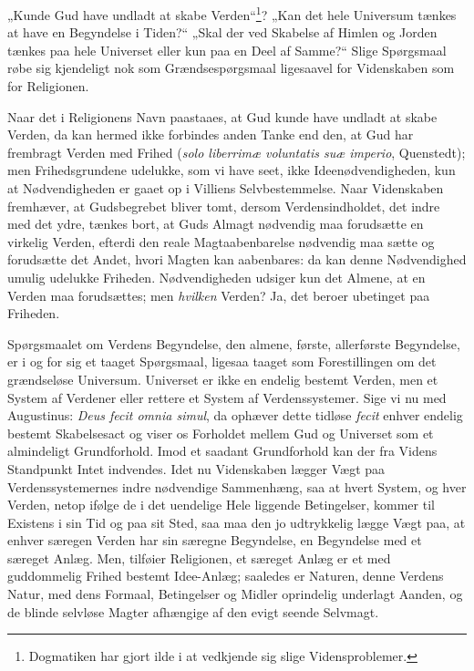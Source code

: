 \documentclass[12pt]{book}
\begin{document}
„Kunde Gud have undladt at skabe Verden“\footnote{Dogmatiken har
gjort ilde i at vedkjende sig slige Vidensproblemer.}? „Kan det hele
Universum tænkes at have en Begyndelse i Tiden?“ „Skal der ved
Skabelse af Himlen og Jorden tænkes paa hele Universet eller kun paa
en Deel af Samme?“ Slige Spørgsmaal røbe sig kjendeligt nok som
Grændsespørgsmaal ligesaavel for Videnskaben som for Religionen.

Naar det i Religionens Navn paastaaes, at Gud kunde have undladt at
skabe Verden, da kan hermed ikke
forbindes anden Tanke end den, at Gud har frembragt Verden med Frihed
(\textit{solo liberrimæ voluntatis suæ imperio}, Quenstedt); men
Frihedsgrundene udelukke, som vi have seet, ikke Ideenødvendigheden,
kun at Nødvendigheden er gaaet op i Villiens Selvbestemmelse. Naar
Videnskaben fremhæver, at Gudsbegrebet bliver tomt, dersom
Verdensindholdet, det indre med det ydre, tænkes bort, at Guds
Almagt nødvendig maa forudsætte en virkelig Verden, efterdi den
reale Magtaabenbarelse nødvendig maa sætte og forudsætte det Andet,
hvori Magten kan aabenbares: da kan denne Nødvendighed umulig
udelukke Friheden. Nødvendigheden udsiger kun det Almene, at en
Verden maa forudsættes; men \emph{hvilken} Verden? Ja, det beroer
ubetinget paa Friheden.

Spørgsmaalet om Verdens Begyndelse, den almene, første, allerførste
Begyndelse, er i og for sig et taaget Spørgsmaal, ligesaa taaget som
Forestillingen om det grændseløse Universum. Universet er ikke en
endelig bestemt Verden, men et System af Verdener eller rettere et
System af Verdenssystemer. Sige vi nu med Augustinus:
\textit{Deus fecit omnia simul}, da ophæver dette tidløse
\textit{fecit} enhver endelig bestemt Skabelsesact og viser os
Forholdet mellem Gud og Universet som et almindeligt Grundforhold.
Imod et saadant Grundforhold kan der fra Videns Standpunkt Intet
indvendes. Idet nu Videnskaben lægger Vægt paa Verdenssystemernes
indre nødvendige Sammenhæng, saa at hvert System, og hver Verden,
netop ifølge de i det uendelige Hele liggende Betingelser, kommer
til Existens i sin Tid og paa sit Sted, saa maa den jo udtrykkelig
lægge Vægt paa, at enhver særegen Verden har sin særegne
Begyndelse, en Begyndelse med et særeget Anlæg. Men, tilføier
Religionen, et særeget Anlæg er et med guddommelig Frihed bestemt
Idee-Anlæg; saaledes er Naturen, denne Verdens Natur, med dens
Formaal, Betingelser
og Midler oprindelig underlagt Aanden, og de blinde selvløse Magter
afhængige af den evigt seende Selvmagt.
\end{document}
